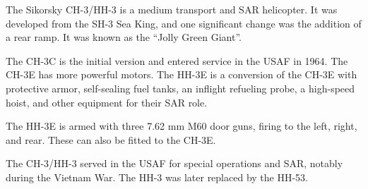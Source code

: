

The Sikorsky CH-3/HH-3 is a medium transport and SAR helicopter. It was developed from the SH-3 Sea King, and one significant change was the addition of a rear ramp. It was known as the “Jolly Green Giant”.

The CH-3C is the initial version and entered service in the USAF in 1964. The CH-3E has more powerful motors. The HH-3E is a conversion of the CH-3E with protective armor, self-sealing fuel tanks, an inflight refueling probe, a high-speed hoist, and other equipment for their SAR role.

The HH-3E is armed with three 7.62 mm M60 door guns, firing to the left, right, and rear. These can also be fitted to the CH-3E.

The CH-3/HH-3 served in the USAF for special operations and SAR, notably during the Vietnam War. The HH-3 was later replaced by the HH-53.
